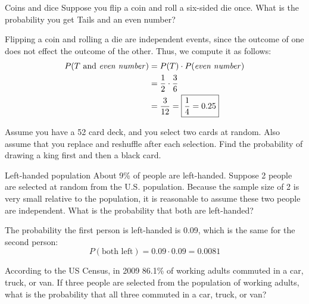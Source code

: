 \begin{example}[https://www.youtube.com/watch?v=twQYgbDkgro&list=PLfmpjsIzhzts14-9s5QixRje97EI2oeMF&index=20]{Coins and dice}
Suppose you flip a coin and roll a six-sided die once. What is the probability you get Tails and an even number?  

\sol
Flipping a coin and rolling a die are independent events, since the outcome of one does not effect the outcome of the other. Thus, we compute it as follows:
\begin{align*}
P(T \mbox{ and } \mbox{\emph{even number}}) &= P(T) \cdot P(\mbox{\emph{even number}})\\
&= \frac{1}{2} \cdot \frac{3}{6}\\
&= \frac{3}{12} = \boxed{\frac{1}{4} = 0.25}
\end{align*}
\end{example}

\begin{try}
Assume you have a 52 card deck, and you select two cards at random. Also
assume that you replace and reshuffle after each selection. Find the probability of drawing a king first and then a black card.
\end{try}

\begin{example}[https://www.youtube.com/watch?v=GL_EhwQq-98&list=PLfmpjsIzhzts14-9s5QixRje97EI2oeMF&index=21]{Left-handed population}
About 9\% of people are left-handed. Suppose 2 people are selected at random from the U.S. population. Because the sample size of 2 is
very small relative to the population, it is reasonable to assume these two people are independent. What is the probability that both are left-handed? 

\solline
The probability the first person is left-handed is 0.09, which is the same for the second person: \[P(\textrm{both left}) = 0.09 \cdot 0.09  = \boxed{0.0081} \]
\end{example}

\begin{try}
According to the US Census, in 2009 86.1\% of working adults commuted in a car, truck, or van. If three people are selected from the population of working adults, what is the probability that all three commuted in a car, truck, or van?
\end{try}

